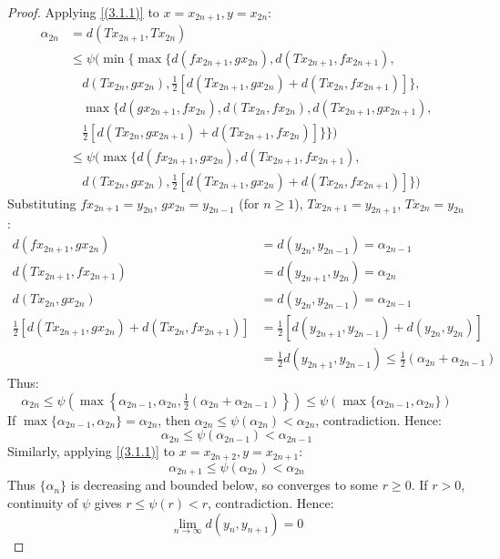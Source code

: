 \documentclass[10pt,a4paper]{amsart}
\begin{document}
\begin{proof}
Applying \eqref{(3.1.1)} to $x = x_{2n+1}, y = x_{2n}$:
\begin{align*}
\alpha_{2n} &= d(T x_{2n+1}, T x_{2n}) \\
&\leq \psi\Big(\min\Big\{\max\big\{d(fx_{2n+1}, gx_{2n}), d(Tx_{2n+1}, fx_{2n+1}), \\
&\quad d(Tx_{2n}, gx_{2n}), \tfrac{1}{2}[d(Tx_{2n+1}, gx_{2n}) + d(Tx_{2n}, fx_{2n+1})]\big\}, \\
&\quad \max\big\{d(gx_{2n+1}, fx_{2n}), d(Tx_{2n}, fx_{2n}), d(Tx_{2n+1}, gx_{2n+1}), \\
&\quad \tfrac{1}{2}[d(Tx_{2n}, gx_{2n+1}) + d(Tx_{2n+1}, fx_{2n})]\big\}\Big\}\Big) \\
&\leq \psi \Big( \max \big\{ d(f x_{2n+1}, g x_{2n}), d(T x_{2n+1}, f x_{2n+1}), \\
&\quad d(T x_{2n}, g x_{2n}), \tfrac{1}{2}[d(T x_{2n+1}, g x_{2n}) + d(T x_{2n}, f x_{2n+1})] \big\} \Big)
\end{align*}
Substituting $f x_{2n+1} = y_{2n}$, $g x_{2n} = y_{2n-1}$ (for $n \geq 1$), $T x_{2n+1} = y_{2n+1}$, $T x_{2n} = y_{2n}$:
\begin{align*}
d(f x_{2n+1}, g x_{2n}) &= d(y_{2n}, y_{2n-1}) = \alpha_{2n-1} \\
d(T x_{2n+1}, f x_{2n+1}) &= d(y_{2n+1}, y_{2n}) = \alpha_{2n} \\
d(T x_{2n}, g x_{2n}) &= d(y_{2n}, y_{2n-1}) = \alpha_{2n-1} \\
\tfrac{1}{2}[d(T x_{2n+1}, g x_{2n}) + d(T x_{2n}, f x_{2n+1})] &= \tfrac{1}{2}[d(y_{2n+1}, y_{2n-1}) + d(y_{2n}, y_{2n})] \\
&= \tfrac{1}{2} d(y_{2n+1}, y_{2n-1}) \leq \tfrac{1}{2} (\alpha_{2n} + \alpha_{2n-1})
\end{align*}
Thus:
\[
\alpha_{2n} \leq \psi \left( \max \left\{ \alpha_{2n-1}, \alpha_{2n}, \tfrac{1}{2}(\alpha_{2n} + \alpha_{2n-1}) \right\} \right) \leq \psi \left( \max \{\alpha_{2n-1}, \alpha_{2n}\} \right)
\]
If $\max\{\alpha_{2n-1}, \alpha_{2n}\} = \alpha_{2n}$, then $\alpha_{2n} \leq \psi(\alpha_{2n}) < \alpha_{2n}$, contradiction. Hence:
\begin{equation} \label{eq:even-dec}
\alpha_{2n} \leq \psi(\alpha_{2n-1}) < \alpha_{2n-1}
\end{equation}
Similarly, applying \eqref{(3.1.1)} to $x = x_{2n+2}, y = x_{2n+1}$:
\begin{equation} \label{eq:odd-dec}
\alpha_{2n+1} \leq \psi(\alpha_{2n}) < \alpha_{2n}
\end{equation}
Thus $\{\alpha_n\}$ is decreasing and bounded below, so converges to some $r \geq 0$. If $r > 0$, continuity of $\psi$ gives $r \leq \psi(r) < r$, contradiction. Hence:
\begin{equation} \label{eq:dist-conv}
\lim_{n \to \infty} d(y_n, y_{n+1}) = 0
\end{equation}


\end{proof}
\end{document}
